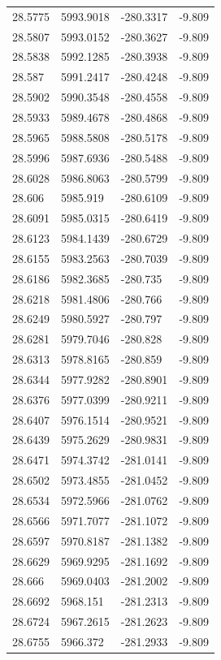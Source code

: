 \begin{table}[H]
\begin{tabular}{llll}
28.5775 & 5993.9018 & -280.3317 & -9.809 \\
28.5807 & 5993.0152 & -280.3627 & -9.809 \\
28.5838 & 5992.1285 & -280.3938 & -9.809 \\
28.587 & 5991.2417 & -280.4248 & -9.809 \\
28.5902 & 5990.3548 & -280.4558 & -9.809 \\
28.5933 & 5989.4678 & -280.4868 & -9.809 \\
28.5965 & 5988.5808 & -280.5178 & -9.809 \\
28.5996 & 5987.6936 & -280.5488 & -9.809 \\
28.6028 & 5986.8063 & -280.5799 & -9.809 \\
28.606 & 5985.919 & -280.6109 & -9.809 \\
28.6091 & 5985.0315 & -280.6419 & -9.809 \\
28.6123 & 5984.1439 & -280.6729 & -9.809 \\
28.6155 & 5983.2563 & -280.7039 & -9.809 \\
28.6186 & 5982.3685 & -280.735 & -9.809 \\
28.6218 & 5981.4806 & -280.766 & -9.809 \\
28.6249 & 5980.5927 & -280.797 & -9.809 \\
28.6281 & 5979.7046 & -280.828 & -9.809 \\
28.6313 & 5978.8165 & -280.859 & -9.809 \\
28.6344 & 5977.9282 & -280.8901 & -9.809 \\
28.6376 & 5977.0399 & -280.9211 & -9.809 \\
28.6407 & 5976.1514 & -280.9521 & -9.809 \\
28.6439 & 5975.2629 & -280.9831 & -9.809 \\
28.6471 & 5974.3742 & -281.0141 & -9.809 \\
28.6502 & 5973.4855 & -281.0452 & -9.809 \\
28.6534 & 5972.5966 & -281.0762 & -9.809 \\
28.6566 & 5971.7077 & -281.1072 & -9.809 \\
28.6597 & 5970.8187 & -281.1382 & -9.809 \\
28.6629 & 5969.9295 & -281.1692 & -9.809 \\
28.666 & 5969.0403 & -281.2002 & -9.809 \\
28.6692 & 5968.151 & -281.2313 & -9.809 \\
28.6724 & 5967.2615 & -281.2623 & -9.809 \\
28.6755 & 5966.372 & -281.2933 & -9.809 \\

\end{tabular}
\end{table}
